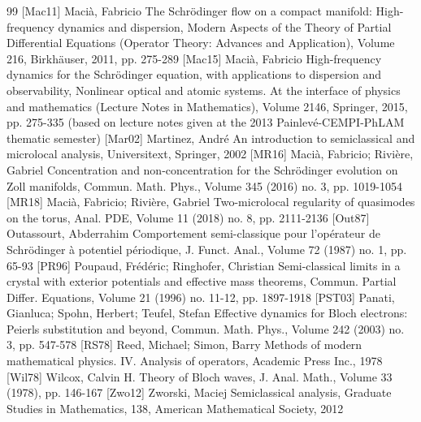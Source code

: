 \begin{thebibliography}{99}
 [Mac11] Macià, Fabricio The Schrödinger flow on a compact manifold: High-frequency dynamics and dispersion, Modern Aspects of the Theory of Partial Differential Equations (Operator Theory: Advances and Application), Volume 216, Birkhäuser, 2011, pp. 275-289
 [Mac15] Macià, Fabricio High-frequency dynamics for the Schrödinger equation, with applications to dispersion and observability, Nonlinear optical and atomic systems. At the interface of physics and mathematics (Lecture Notes in Mathematics), Volume 2146, Springer, 2015, pp. 275-335 (based on lecture notes given at the 2013 Painlevé-CEMPI-PhLAM thematic semester)
 [Mar02] Martinez, André An introduction to semiclassical and microlocal analysis, Universitext, Springer, 2002
 [MR16] Macià, Fabricio; Rivière, Gabriel Concentration and non-concentration for the Schrödinger evolution on Zoll manifolds, Commun. Math. Phys., Volume 345 (2016) no. 3, pp. 1019-1054
 [MR18] Macià, Fabricio; Rivière, Gabriel Two-microlocal regularity of quasimodes on the torus, Anal. PDE, Volume 11 (2018) no. 8, pp. 2111-2136
 [Out87] Outassourt, Abderrahim Comportement semi-classique pour l’opérateur de Schrödinger à potentiel périodique, J. Funct. Anal., Volume 72 (1987) no. 1, pp. 65-93
 [PR96] Poupaud, Frédéric; Ringhofer, Christian Semi-classical limits in a crystal with exterior potentials and effective mass theorems, Commun. Partial Differ. Equations, Volume 21 (1996) no. 11-12, pp. 1897-1918
 [PST03] Panati, Gianluca; Spohn, Herbert; Teufel, Stefan Effective dynamics for Bloch electrons: Peierls substitution and beyond, Commun. Math. Phys., Volume 242 (2003) no. 3, pp. 547-578
 [RS78] Reed, Michael; Simon, Barry Methods of modern mathematical physics. IV. Analysis of operators, Academic Press Inc., 1978
 [Wil78] Wilcox, Calvin H. Theory of Bloch waves, J. Anal. Math., Volume 33 (1978), pp. 146-167
 [Zwo12] Zworski, Maciej Semiclassical analysis, Graduate Studies in Mathematics, 138, American Mathematical Society, 2012
\end{thebibliography}
